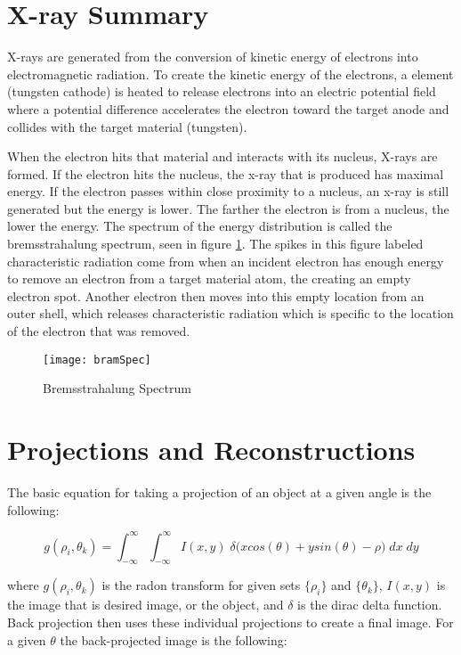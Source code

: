 \section{X-ray Summary}

X-rays are generated from the conversion of kinetic energy of electrons into electromagnetic radiation. To create the kinetic energy of the electrons, a element (tungsten cathode) is heated to release electrons into an electric potential field where a potential difference accelerates the electron toward the target anode and collides with the target material (tungsten).

When the electron hits that material and interacts with its nucleus, X-rays are formed. If the electron hits the nucleus, the x-ray that is produced has maximal energy. If the electron passes within close proximity to a nucleus, an x-ray is still generated but the energy is lower.  The farther the electron is from a nucleus, the lower the energy.  The spectrum of the energy distribution is called the bremsstrahalung spectrum, seen in figure \ref{fig:ct:brem}.  The spikes in this figure labeled characteristic radiation come from when an incident electron has enough energy to remove an electron from a target material atom, the creating an empty electron spot.  Another electron then moves into this empty location from an outer shell, which releases characteristic radiation which is specific to the location of the electron that was removed. 

\begin{figure}[h]
	\centering
	\texttt{[image: bramSpec]}
	\caption{Bremsstrahalung Spectrum}
	\label{fig:ct:brem}
\end{figure}

\section{Projections and Reconstructions}

The basic equation for taking a projection of an object at a given angle is the following:

\begin{equation}
g(\rho_i,\theta_k) = \int_{-\infty}^{\infty} \int_{-\infty}^{\infty} I(x,y) \; \delta \big(xcos(\theta) + ysin(\theta) - \rho \big) \; dx \; dy
\label{eq:Radon}
\end{equation}

\noindent
where $g(\rho_i,\theta_k)$ is the radon transform for given sets $\{\rho_i\}$ and $\{\theta_k\}$, $I(x,y)$ is the image that is desired image, or the object, and $\delta$ is the dirac delta function. Back projection then uses these individual projections to create a final image.  For a given $\theta$ the back-projected image is the following:

